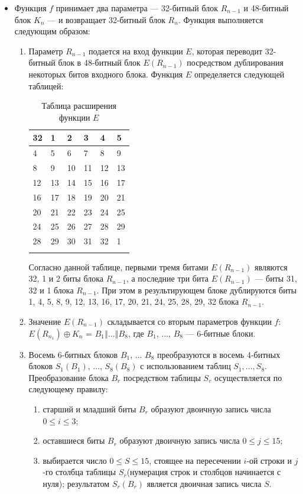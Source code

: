 \documentclass{./civarticle}
\begin{document}
\begin{itemize}
\begin{enumerate}
\end{enumerate}

\item Функция $f$ принимает два параметра --- 32-битный блок $R_{n-1}$ и 48-битный блок $K_n$ --- и возвращает 32-битный блок $R_n$. Функция выполняется следующим образом: 

\begin{enumerate}
    \item Параметр $R_{n-1}$ подается на вход функции $E$, которая переводит 32-битный блок в 48-битный блок $E(R_{n-1})$ посредством дублирования некоторых битов входного блока. Функция $E$ определяется следующей таблицей:

    \begin{longtable}{|p{0.5cm}|p{0.5cm}|p{0.5cm}|p{0.5cm}|p{0.5cm}|p{0.5cm}|}
\hline
32 & 1 & 2 & 3 & 4 & 5 \\
\hline
4 & 5 & 6 & 7 & 8 & 9 \\
\hline
8 & 9 & 10 & 11 & 12 & 13 \\
\hline
12 & 13 & 14 & 15 & 16 & 17 \\
\hline
16 & 17 & 18 & 19 & 20 & 21 \\
\hline
20 & 21 & 22 & 23 & 24 & 25 \\
\hline
24 & 25 & 26 & 27 & 28 & 29 \\
\hline
28 & 29 & 30 & 31 & 32 & 1 \\
\hline
\caption{Таблица расширения функции $E$}
\end{longtable}

Согласно данной таблице, первыми тремя битами $E(R_{n-1})$ являются 32, 1 и 2 биты блока $R_{n-1}$, а последние три бита $E(R_{n-1})$ --- биты 31, 32 и 1 блока $R_{n-1}$. При этом в результирующем блоке дублируются биты 1, 4, 5, 8, 9, 12, 13, 16, 17, 20, 21, 24, 25, 28, 29, 32 блока $R_{n-1}$.

\item Значение $E(R_{n-1})$ складывается со вторым параметров функции $f$: $E(R_{n_1}) \oplus K_n$ = $B_1 \mathbin\Vert ... \mathbin\Vert B_8$, где $B_1$, ..., $B_8$ --- 6-битные блоки.

\item Восемь 6-битных блоков $B_1$, ... $B_8$ преобразуются в восемь 4-битных блоков $S_1(B_1)$, ..., $S_8(B_8)$ с использованием таблиц $S_1, ..., S_8$. Преобразование блока $B_r$ посредством таблицы $S_r$ осуществляется по следующему правилу: 
\begin{enumerate}
    \item старший и младший биты $B_r$ образуют двоичную запись числа $0 \leq i \leq 3$;
    \item оставшиеся биты $B_r$ образуют двоичную запись числа $0 \leq j \leq 15$;
    \item выбирается число $0 \leq S \leq 15$, стоящее на пересечении $i$-ой строки и $j$-го столбца таблицы $S_r$(нумерация строк и столбцов начинается с нуля); результатом $S_r(B_r)$ является двоичная запись числа $S$.
\end{enumerate}


\end{enumerate}
\end{itemize}
\end{document}
